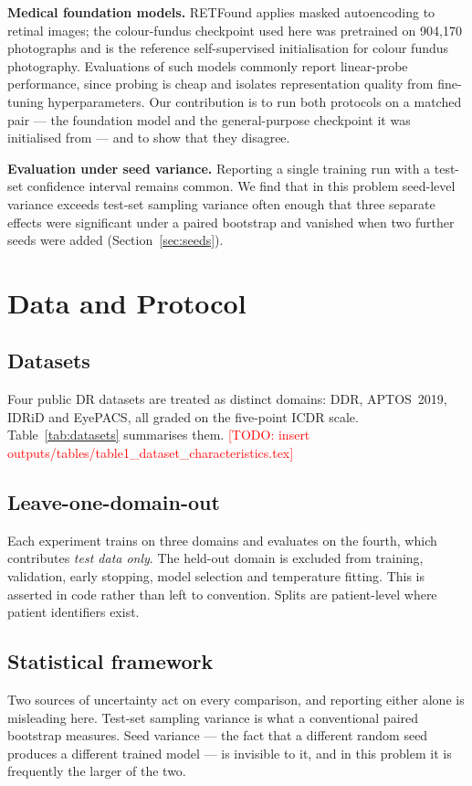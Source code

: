 \documentclass[journal]{IEEEtran}
\newcommand{\todo}[1]{\textcolor{red}{[TODO: #1]}}
\begin{document}
\textbf{Medical foundation models.} RETFound \cite{zhou2023retfound} applies
masked autoencoding \cite{he2022mae} to retinal images; the colour-fundus
checkpoint used here was pretrained on 904{,}170 photographs and is the
reference self-supervised initialisation for colour fundus photography.
Evaluations of such models commonly report linear-probe performance, since
probing is cheap and isolates representation quality from fine-tuning
hyperparameters. Our contribution is to run both protocols on a matched pair
--- the foundation model and the general-purpose checkpoint it was initialised
from --- and to show that they disagree.

\textbf{Evaluation under seed variance.} Reporting a single training run with a
test-set confidence interval remains common. We find that in this problem
seed-level variance exceeds test-set sampling variance often enough that three
separate effects were significant under a paired bootstrap and vanished when
two further seeds were added (Section~\ref{sec:seeds}).

\section{Data and Protocol}

\subsection{Datasets}
Four public DR datasets are treated as distinct domains: DDR, APTOS~2019,
IDRiD and EyePACS, all graded on the five-point ICDR scale.
Table~\ref{tab:datasets} summarises them. \todo{insert
outputs/tables/table1\_dataset\_characteristics.tex}

\subsection{Leave-one-domain-out}
Each experiment trains on three domains and evaluates on the fourth, which
contributes \emph{test data only}. The held-out domain is excluded from
training, validation, early stopping, model selection and temperature fitting.
This is asserted in code rather than left to convention. Splits are
patient-level where patient identifiers exist.

\subsection{Statistical framework}
\label{sec:bars}
Two sources of uncertainty act on every comparison, and reporting either
alone is misleading here. Test-set sampling variance is what a conventional
paired bootstrap measures. Seed variance --- the fact that a different random
seed produces a different trained model --- is invisible to it, and in this
problem it is frequently the larger of the two.
\end{document}

